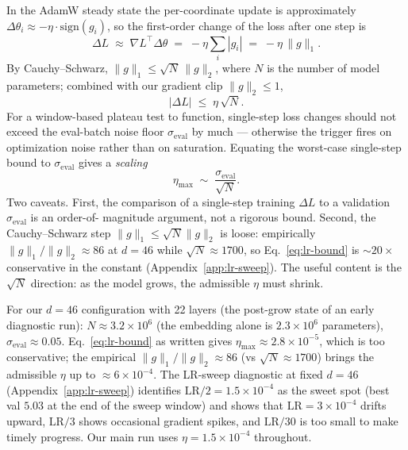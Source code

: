 \documentclass{article}
\begin{document}
In the AdamW steady state the per-coordinate update is approximately
$\Delta\theta_i \approx -\eta\cdot\mathrm{sign}(g_i)$, so the first-order
change of the loss after one step is
\begin{equation}
\Delta L \;\approx\; \nabla L^{\!\top} \!\Delta\theta
            \;=\; -\eta \sum_i |g_i|
            \;=\; -\eta\,\|g\|_1.
\end{equation}
By Cauchy--Schwarz, $\|g\|_1 \le \sqrt{N}\,\|g\|_2$, where $N$ is the number
of model parameters; combined with our gradient clip $\|g\|_2 \le 1$,
\begin{equation}
|\Delta L| \;\le\; \eta\,\sqrt{N}.
\end{equation}
For a window-based plateau test to function, single-step loss changes
should not exceed the eval-batch noise floor $\sigma_{\text{eval}}$
by much --- otherwise the trigger fires on optimization noise rather
than on saturation.  Equating the worst-case single-step bound to
$\sigma_{\text{eval}}$ gives a \emph{scaling}
\begin{equation}
\eta_{\max} \;\sim\; \frac{\sigma_{\text{eval}}}{\sqrt{N}}.
\label{eq:lr-bound}
\end{equation}
Two caveats.  First, the comparison of a single-step training
$\Delta L$ to a validation $\sigma_{\text{eval}}$ is an order-of-
magnitude argument, not a rigorous bound.  Second, the
Cauchy--Schwarz step $\|g\|_1 \le \sqrt{N} \|g\|_2$ is loose:
empirically $\|g\|_1 / \|g\|_2 \approx 86$ at $d{=}46$ while
$\sqrt{N} \approx 1700$, so Eq.~\ref{eq:lr-bound} is $\sim 20{\times}$
conservative in the constant (Appendix~\ref{app:lr-sweep}).  The
useful content is the $\sqrt{N}$ direction: as the model grows, the
admissible $\eta$ must shrink.

For our $d=46$ configuration with 22 layers (the post-grow state of
an early diagnostic run): $N \approx 3.2\times 10^{6}$ (the embedding
alone is $2.3{\times}10^6$ parameters), $\sigma_{\text{eval}} \approx
0.05$.  Eq.~\ref{eq:lr-bound} as written gives
$\eta_{\max} \approx 2.8\times 10^{-5}$, which is too conservative;
the empirical $\|g\|_1/\|g\|_2 \approx 86$ (vs $\sqrt{N} \approx
1700$) brings the admissible $\eta$ up to $\approx 6{\times}10^{-4}$.
The LR-sweep diagnostic at fixed $d{=}46$ (Appendix~\ref{app:lr-sweep})
identifies $\mathrm{LR}/2 = 1.5{\times}10^{-4}$ as the sweet spot
(best val $5.03$ at the end of the sweep window) and shows that
$\mathrm{LR}=3{\times}10^{-4}$ drifts upward, $\mathrm{LR}/3$ shows
occasional gradient spikes, and $\mathrm{LR}/30$ is too small to make
timely progress.  Our main run uses $\eta = 1.5{\times}10^{-4}$
throughout.
\end{document}
